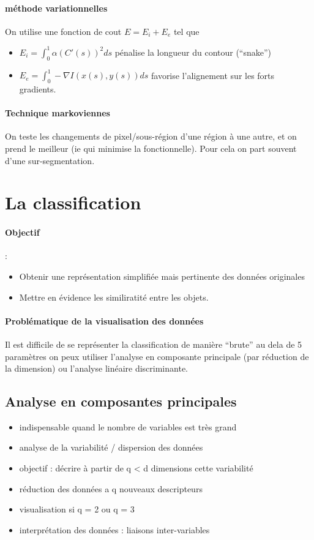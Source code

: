 \documentclass[main.tex]{subfiles}
\begin{document}
\paragraph{méthode variationnelles}
On utilise une fonction de cout $E = E_i+E_e$ tel que
\begin{itemize}
\item $  E_i = \int_{0}^{1}\alpha (C'(s))^2ds$ pénalise la longueur du contour (``snake'')
\item $E_e = \int_{0}^{1}-\nabla I(x(s),y(s))ds$ favorise l'alignement sur les forts gradients.
\end{itemize}

\paragraph{Technique markoviennes}

On teste les changements de pixel/sous-région  d'une région à une autre, et on prend le meilleur (ie qui minimise la fonctionnelle). Pour cela on part souvent d'une sur-segmentation.


\section{La classification}
\paragraph{Objectif}:
\begin{itemize}
\item Obtenir une représentation simplifiée mais pertinente des données originales
\item Mettre en évidence les similiratité entre les objets.
\end{itemize}

\paragraph{Problématique de la visualisation des données}

Il est difficile de se représenter la classification de manière ``brute'' au dela de 5 paramètres on peux utiliser l'analyse en composante principale (par réduction de la dimension) ou l'analyse linéaire discriminante.


\subsection{Analyse en composantes principales}
\begin{itemize}
\item indispensable quand le nombre de variables est très grand
\item analyse de la variabilité / dispersion des données
\item objectif : décrire à partir de q < d dimensions cette variabilité
\item réduction des données a q nouveaux descripteurs
\item visualisation si q = 2 ou q = 3
\item interprétation des données : liaisons inter-variables
\end{itemize}
\end{document}
